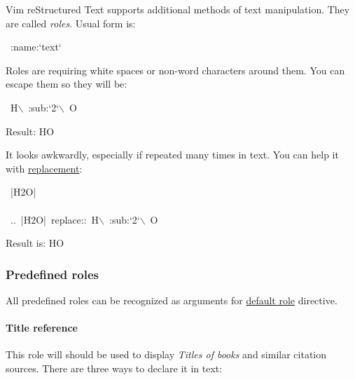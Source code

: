 \documentclass[12pt]{article}
\newcommand{\subs}[1]{\raisebox{-0.7ex}{\footnotesize #1}}
\begin{document}
Vim reStructured Text supports additional methods of text manipulation. They are called
\emph{roles}. Usual form is:

\begin{ttfamily}\begin{flushleft}
\mbox{~:name:`text`}\\
\end{flushleft}\end{ttfamily}

Roles are requiring white spaces or non-word characters around them. You
can escape them so they will be:

\begin{ttfamily}\begin{flushleft}
\mbox{~H$\backslash$~:sub:`2`$\backslash$~O}\\
\end{flushleft}\end{ttfamily}

Result: H\subs{2}O

It looks awkwardly, especially if repeated many times in text. You can
help it with \href{\#lreplacement}{replacement}:

\begin{ttfamily}\begin{flushleft}
\mbox{~|H2O|}\\
\mbox{}\\
\mbox{~..~|H2O|~replace::~H$\backslash$~:sub:`2`$\backslash$~O}\\
\end{flushleft}\end{ttfamily}

Result is: H\subs{2}O

\hypertarget{lpredefined-roles}{}
\subsubsection{Predefined roles}

All predefined roles can be recognized as arguments for \href{\#ldefault-role}{default role}
directive.

\hypertarget{ltitle-reference}{}
\paragraph{Title reference}

This role will should be used to display \emph{Titles of books} and similar
citation sources. There are three ways to declare it in text:
\end{document}
